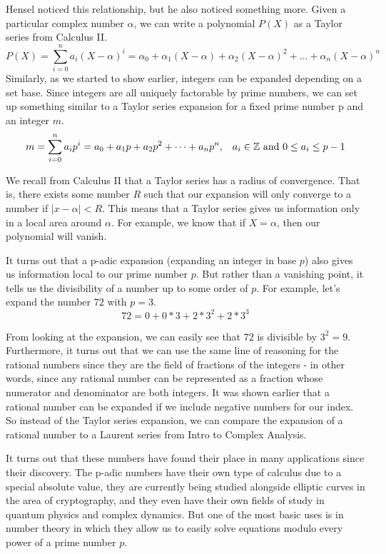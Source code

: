 \documentclass[a4paper]{article}
\begin{document}
Hensel noticed this relationship, but he also noticed something more. 
Given a particular complex number $\alpha$, we can write a polynomial
$P(X)$ as a Taylor series from Calculus II.
\[
	P(X)=\sum_{i=0}^n a_i(X-\alpha)^i=\alpha_0+\alpha_1(X-\alpha)+
    \alpha_2(X-\alpha)^2+\dots+\alpha_n(X-\alpha)^n
\]
Similarly, as we started to show earlier, integers can be expanded 
depending on a set base.  Since integers are all uniquely factorable by 
prime numbers, we can set up something similar to a Taylor series 
expansion for a fixed prime number p and an integer $m$.
\[
	m=\sum_{i=0}^na_ip^i=a_0+a_1p+a_2p^2+\dots+a_np^n,\;\;\;a_i\in\mathbb Z
    \text{ and }0\leq a_i\leq p-1
\]

We recall from Calculus II that a Taylor series has a radius of
convergence.  That is, there exists some number $R$ such that our 
expansion will only converge to a number if $|x-\alpha| < R$.  This means 
that a Taylor series gives us information only in a local area around
$\alpha$.  For example, we know that if $X=\alpha$, then our polynomial
will vanish.

It turns out that a p-adic expansion (expanding an integer in base $p$)
also gives us information local to our prime number $p$.  But rather than
a vanishing point, it tells us the divisibility of a number up to some
order of $p$.  For example, let's expand the number $72$ with $p=3$.
\[
	72=0+0*3+2*3^2+2*3^3
\]

From looking at the expansion, we can easily see that $72$ is divisible by
$3^2=9$.  Furthermore, it turns out that we can use the same line of
reasoning for the rational numbers since they are the field of fractions
of the integers - in other words, since any rational number can be
represented as a fraction whose numerator and denominator are both
integers.  It was shown earlier that a rational number can be expanded if
we include negative numbers for our index.  So instead of the Taylor
series expansion, we can compare the expansion of a rational number to a
Laurent series from Intro to Complex Analysis.

It turns out that these numbers have found their place in many applications
since their discovery.  The p-adic numbers have their own type of calculus 
due to a special absolute value, they are currently being studied 
alongside elliptic curves in the area of cryptography, and they even have
their own fields of study in quantum physics and complex dynamics.  But
one of the most basic uses is in number theory in which they allow us to 
easily solve equations modulo every power of a prime number $p$.
\end{document}

